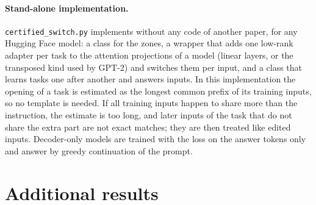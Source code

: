 \paragraph{Stand-alone implementation.} \texttt{certified\_switch.py} implements \cert{} without
any code of another paper, for any Hugging Face model: a class for the zones, a wrapper that adds
one low-rank adapter per task to the attention projections of a model (linear layers, or the
transposed kind used by GPT-2) and switches them per input, and a class that learns tasks one after
another and answers inputs. In this implementation the opening of a task is estimated as the longest common
prefix of its training inputs, so no template is needed. If all training inputs happen to share
more than the instruction, the estimate is too long, and later inputs of the task that do not share
the extra part are not exact matches; they are then treated like edited inputs. Decoder-only models are trained with the
loss on the answer tokens only and answer by greedy continuation of the prompt.

\clearpage
\section{Additional results}
\label{app:more}

\begin{table}[h]
  \caption{Five tasks: scores written by the official script, which compares each answer with one
  randomly picked reference answer.}
  \label{tab:fiveofficial}
  \centering
  \small
  
\end{table}

\begin{table}[h]
  \caption{Five tasks: score right after learning (Learned) and forgetting (FT) for each wording.}
  \label{tab:fivemore}
  \centering
  \small
  
\end{table}

\begin{table}[h]
  \caption{Five tasks, original wording: score of each task right after it was learned $\to$ after
  the last task.}
  \label{tab:fivepertask}
  \centering
  \small
  
\end{table}

\begin{table}[h]
  \caption{Five tasks: opening length $n_k$, radius $R_k$, and relative distance of the reworded
  test inputs from their own signature, in units of its radius (median over 100 inputs, largest in brackets; 1 is the border of
  the zone). Last column: the smallest relative distance of any of these inputs, in any wording
  (the original included), from the signature of another task, in units of that task's radius. Numbers behind Figure~\ref{fig:margins}.}
  \label{tab:geometry}
  \centering
    \footnotesize
  \setlength{\tabcolsep}{3pt}
  
\end{table}


